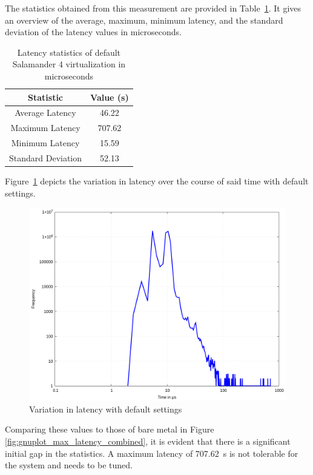 \documentclass[MMR,Master,english]{twbook}
\begin{document}
\noindent The statistics obtained from this measurement are provided in Table~\ref{tab:latency_statistics_virt}. It gives an overview of the average, maximum, minimum latency, and the standard deviation of the latency values in microseconds. 

\begin{table}[H]
	\centering
	\caption{Latency statistics of default Salamander 4 virtualization in microseconds}
	\label{tab:latency_statistics_virt}
	\setlength{\tabcolsep}{0.5em} %
	{\renewcommand{\arraystretch}{1.2}%
	\begin{tabular}{|c|c|}\hline
	\textbf{Statistic} & \textbf{Value (\textmu s)} \\\hline
	Average Latency & 46.22 \\\hline
	Maximum Latency & 707.62 \\\hline
	Minimum Latency & 15.59 \\\hline
	Standard Deviation & 52.13 \\\hline
	\end{tabular}}
	\end{table}

\clearpage

\noindent Figure~\ref{fig:gnuplot_max_latency_default} depicts the variation in latency over the course of said time with default settings. 

\begin{figure}[H]
	\centering
	\includegraphics[width=0.7\columnwidth]{masterthesis-documentation/docs/sigmatek/xenomai/1default/gnuplot_max_latency_default.png}
	\caption[Variation in latency with default settings]{Variation in latency with default settings}
	\label{fig:gnuplot_max_latency_default}
\end{figure}


\noindent Comparing these values to those of bare metal in Figure \ref{fig:gnuplot_max_latency_combined}, it is evident that there is a significant initial gap in the statistics. A maximum latency of 707.62~\textmu s is not tolerable for the system and needs to be tuned. 
\end{document}

